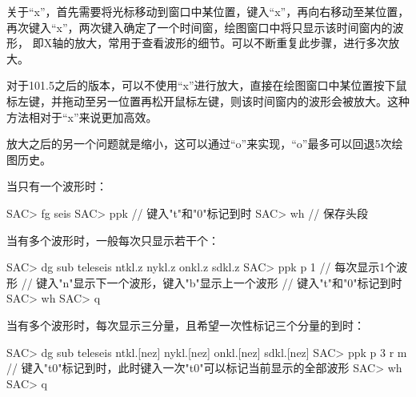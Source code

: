 关于``x''，首先需要将光标移动到窗口中某位置，键入``x''，再向右移动至某位置，
再次键入``x''，两次键入确定了一个时间窗，绘图窗口中将只显示该时间窗内的波形，
即X轴的放大，常用于查看波形的细节。可以不断重复此步骤，进行多次放大。

对于101.5之后的版本，可以不使用``x''进行放大，直接在绘图窗口中某位置按下鼠标左键，并拖动至另一位置再松开鼠标左键，则该时间窗内的波形会被放大。这种方法相对于``x''来说更加高效。

放大之后的另一个问题就是缩小，这可以通过``o''来实现，``o''最多可以回退5次绘图历史。

当只有一个波形时：
\begin{SACCode}
SAC> fg seis
SAC> ppk
// 键入"t"和"0"标记到时
SAC> wh         // 保存头段
\end{SACCode}

当有多个波形时，一般每次只显示若干个：
\begin{SACCode}
SAC> dg sub teleseis ntkl.z nykl.z onkl.z sdkl.z
SAC> ppk p 1    // 每次显示1个波形
// 键入"n"显示下一个波形，键入"b"显示上一个波形
// 键入"t"和"0"标记到时
SAC> wh
SAC> q
\end{SACCode}

当有多个波形时，每次显示三分量，且希望一次性标记三个分量的到时：
\begin{SACCode}
SAC> dg sub teleseis ntkl.[nez] nykl.[nez] onkl.[nez] sdkl.[nez]
SAC> ppk p 3 r m
// 键入"t0"标记到时，此时键入一次"t0"可以标记当前显示的全部波形
SAC> wh
SAC> q
\end{SACCode}
